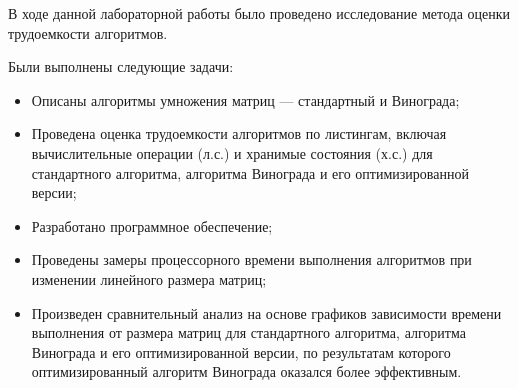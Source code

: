 
В ходе данной лабораторной работы было проведено исследование метода оценки трудоемкости алгоритмов.

Были выполнены следующие задачи:
\begin{itemize}
    \item Описаны алгоритмы умножения матриц — стандартный и Винограда;
    \item Проведена оценка трудоемкости алгоритмов по листингам, включая вычислительные операции (л.с.) и хранимые состояния (х.с.) для стандартного алгоритма, алгоритма Винограда и его оптимизированной версии;
    \item Разработано программное обеспечение;
    \item Проведены замеры процессорного времени выполнения алгоритмов при изменении линейного размера матриц;
    \item Произведен сравнительный анализ на основе графиков зависимости времени выполнения от размера матриц для стандартного алгоритма, алгоритма Винограда и его оптимизированной версии, по результатам которого оптимизированный алгоритм Винограда оказался более эффективным.
\end{itemize}